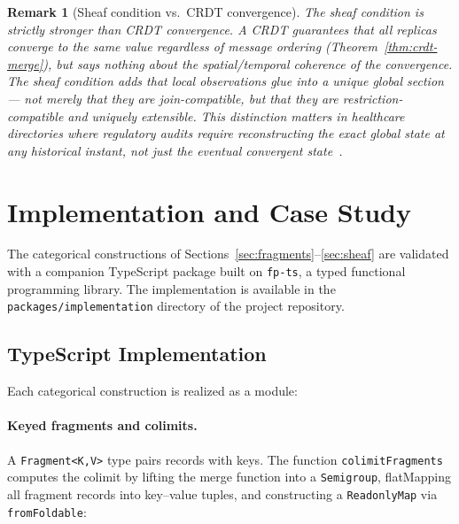 \documentclass[11pt,a4paper]{article}
\newtheorem{remark}[definition]{Remark}
\begin{document}
\begin{remark}[Sheaf condition vs.\ CRDT convergence]
\label{rem:sheaf-vs-crdt}
The sheaf condition is strictly stronger than CRDT convergence. A CRDT
guarantees that \emph{all replicas converge to the same value}
regardless of message ordering (Theorem~\ref{thm:crdt-merge}), but says
nothing about the \emph{spatial/temporal coherence} of the convergence.
The sheaf condition adds that local observations glue into a unique
global section --- not merely that they are join-compatible, but that
they are \emph{restriction-compatible} and uniquely extensible. This
distinction matters in healthcare directories where regulatory audits
require reconstructing the exact global state at any historical
instant, not just the eventual convergent
state~\citep{maclane1992,curry2014}.
\end{remark}

\section{Implementation and Case Study}
\label{sec:implementation}

The categorical constructions of Sections~\ref{sec:fragments}--\ref{sec:sheaf}
are validated with a companion TypeScript package built on \texttt{fp-ts}, a typed
functional programming library. The implementation is available in the
\texttt{packages/implementation} directory of the project repository.

\subsection{TypeScript Implementation}
\label{sec:ts-impl}

Each categorical construction is realized as a module:

\paragraph{Keyed fragments and colimits.}
A \texttt{Fragment<K,V>} type pairs records with keys.
The function \texttt{colimitFragments} computes the colimit by
lifting the merge function into a \texttt{Semigroup}, flatMapping all
fragment records into key--value tuples, and constructing a
\texttt{ReadonlyMap} via \texttt{fromFoldable}:
\end{document}
